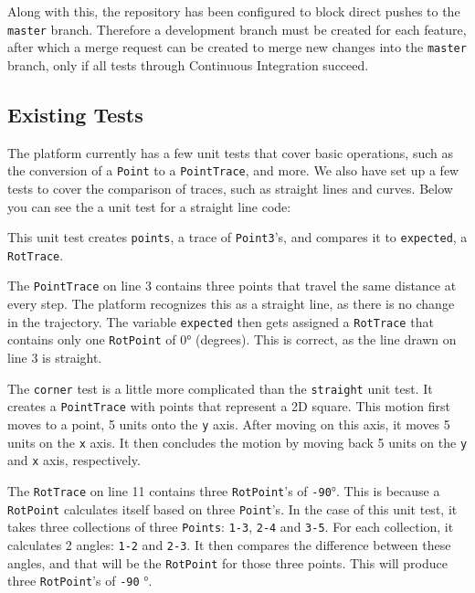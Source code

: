 \documentclass{standalone}
\begin{document}
  Along with this, the repository has been configured to block direct pushes to
  the \verb_master_ branch. Therefore a development branch must be created for
  each feature, after which a merge request can be created to merge new changes
  into the \verb_master_ branch, only if all tests through Continuous
  Integration succeed.

  \subsection{Existing Tests}
  The platform currently has a few unit tests that cover basic operations, such
  as the conversion of a \verb_Point_ to a \verb_PointTrace_, and more. We also
  have set up a few tests to cover the comparison of traces, such as straight
  lines and curves. Below you can see the a unit test for a straight line code:
  

  This unit test creates \verb_points_, a trace of \verb_Point3_'s, and compares
  it to \verb_expected_, a \verb_RotTrace_.

  The \verb_PointTrace_ on line 3 contains three points that travel the same
  distance at every step. The platform recognizes this as a straight line, as
  there is no change in the trajectory. The variable \verb_expected_ then gets
  assigned a \verb_RotTrace_ that contains only one \verb_RotPoint_ of
  0\si{\degree} (degrees). This is correct, as the line drawn on line 3 is straight.

  
  The \verb_corner_ test is a little more complicated than the \verb_straight_
  unit test. It creates a \verb_PointTrace_ with points that represent a 2D
  square. This motion first moves to a point, 5 units onto the \verb_y_ axis.
  After moving on this axis, it moves 5 units on the \verb_x_ axis. It then
  concludes the motion by moving back 5 units on the \verb_y_ and \verb_x_ axis,
  respectively.

  The \verb_RotTrace_ on line 11 contains three \verb_RotPoint_'s of \verb_-90_\si{\degree}.
  This is because a \verb_RotPoint_ calculates itself based on three
  \verb_Point_'s. In the case of this unit test, it takes three collections of
  three \verb_Points_: \verb_1-3_, \verb_2-4_ and \verb_3-5_. For each
  collection, it calculates 2 angles: \verb_1-2_ and \verb_2-3_. It then
  compares the difference between these angles, and that will be the
  \verb_RotPoint_ for those three points. This will produce three
  \verb_RotPoint_'s of \verb_-90_ \si{\degree}.
\end{document}
